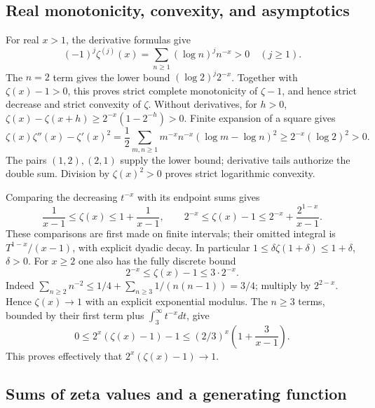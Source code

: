 \subsection{Real monotonicity, convexity, and asymptotics}

For real \(x>1\), the derivative formulas give
\[
 (-1)^j\zeta^{(j)}(x)
       =\sum_{n\geq1}(\log n)^j n^{-x}>0\quad(j\geq1).
                                                               \tag{D22}\label{eq:d-complete-monotone}
\]
The \(n=2\) term gives the lower bound \((\log2)^j2^{-x}\).
Together with \(\zeta(x)-1>0\), this proves strict complete monotonicity
of \(\zeta-1\), and hence strict decrease and strict convexity of \(\zeta\).
Without derivatives, for \(h>0\),
\(\zeta(x)-\zeta(x+h)\geq2^{-x}(1-2^{-h})>0\).
Finite expansion of a square gives
\[
 \zeta(x)\zeta''(x)-\zeta'(x)^2
   =\frac12\sum_{m,n\geq1}m^{-x}n^{-x}(\log m-\log n)^2
   \geq2^{-x}(\log2)^2>0.                             \tag{D23}\label{eq:d-logconvex}
\]
The pairs \((1,2),(2,1)\) supply the lower bound; derivative tails
authorize the double sum. Division by \(\zeta(x)^2>0\) proves strict
logarithmic convexity.

Comparing the decreasing \(t^{-x}\) with its endpoint sums gives
\[
 \frac1{x-1}\leq\zeta(x)\leq1+\frac1{x-1},\qquad
 2^{-x}\leq\zeta(x)-1\leq2^{-x}+\frac{2^{1-x}}{x-1}.   \tag{D24}\label{eq:d-real-bounds}
\]
These comparisons are first made on finite intervals; their omitted
integral is \(T^{1-x}/(x-1)\), with explicit dyadic decay.
In particular \(1\leq\delta\zeta(1+\delta)\leq1+\delta\), \(\delta>0\).
For \(x\geq2\) one also has the fully discrete bound
\[
                2^{-x}\leq\zeta(x)-1\leq3\cdot2^{-x}. \tag{D25}\label{eq:d-three}
\]
Indeed \(\sum_{n\geq2}n^{-2}\leq1/4+
\sum_{n\geq3}1/(n(n-1))=3/4\); multiply by \(2^{2-x}\).
Hence \(\zeta(x)\to1\) with an explicit exponential modulus.
The \(n\geq3\) terms, bounded by their first term plus
\(\int_3^\infty t^{-x}dt\), give
\[
 0\leq2^x(\zeta(x)-1)-1
       \leq(2/3)^x\left(1+\frac3{x-1}\right).           \tag{D26}\label{eq:d-leading-asymptotic}
\]
This proves effectively that \(2^x(\zeta(x)-1)\to1\).

\subsection{Sums of zeta values and a generating function}

